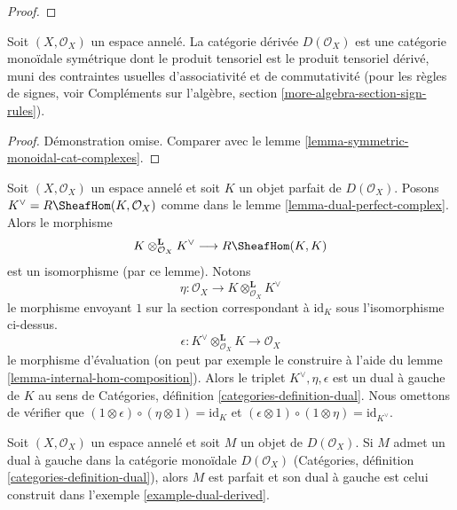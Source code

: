 {\begin{proof}
\end{proof}

\begin{lemma}

\label{lemma-symmetric-monoidal-derived}

Soit $(X, \mathcal{O}_X)$ un espace annelé. La catégorie dérivée
$D(\mathcal{O}_X)$ est une catégorie monoïdale symétrique dont le produit tensoriel est le produit tensoriel dérivé, muni des contraintes usuelles d'associativité et de commutativité (pour les règles de signes, voir Compléments sur l'algèbre, section \ref{more-algebra-section-sign-rules}).

\end{lemma}

\begin{proof}
Démonstration omise. Comparer avec le lemme \ref{lemma-symmetric-monoidal-cat-complexes}.
\end{proof}

\begin{example}

\label{example-dual-derived}

Soit $(X, \mathcal{O}_X)$ un espace annelé et soit $K$ un objet parfait de $D(\mathcal{O}_X)$. Posons $K^\vee = R\SheafHom(K, \mathcal{O}_X)$
comme dans le lemme \ref{lemma-dual-perfect-complex}. Alors le morphisme
$$
K \otimes_{\mathcal{O}_X}^\mathbf{L} K^\vee \longrightarrow R\SheafHom(K, K)
$$
est un isomorphisme (par ce lemme). Notons
$$
\eta :
\mathcal{O}_X
\longrightarrow
K \otimes_{\mathcal{O}_X}^\mathbf{L} K^\vee
$$
le morphisme envoyant $1$ sur la section correspondant à
$\text{id}_K$ sous l'isomorphisme ci-dessus.
$$
\epsilon : 
K^\vee
\otimes_{\mathcal{O}_X}^\mathbf{L} K
\longrightarrow
\mathcal{O}_X
$$
le morphisme d'évaluation (on peut par exemple le construire à l'aide du lemme \ref{lemma-internal-hom-composition}). Alors
le triplet $K^\vee, \eta, \epsilon$ est un dual à gauche de $K$ au sens de Catégories, définition \ref{categories-definition-dual}. Nous omettons de vérifier que
$(1 \otimes \epsilon) \circ (\eta \otimes 1) = \text{id}_K$
et
$(\epsilon \otimes 1) \circ (1 \otimes \eta) =
\text{id}_{K^\vee}$.

\end{example}

\begin{lemma}

\label{lemma-left-dual-derived}
Soit $(X, \mathcal{O}_X)$ un espace annelé et soit $M$ un objet de $D(\mathcal{O}_X)$. Si $M$ admet un dual à gauche dans la catégorie monoïdale $D(\mathcal{O}_X)$ (Catégories, définition \ref{categories-definition-dual}), alors $M$ est parfait et son dual à gauche est celui construit dans l'exemple \ref{example-dual-derived}.
\end{lemma}

}
